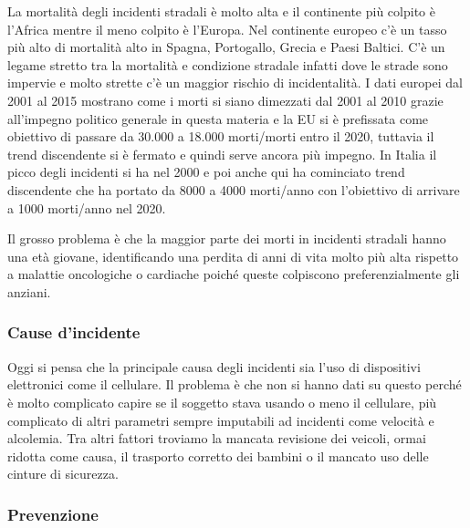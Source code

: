 La
mortalità degli incidenti stradali è molto alta e il continente più
colpito è l'Africa mentre il meno colpito è l'Europa. Nel continente
europeo c'è un tasso più alto di mortalità alto in Spagna, Portogallo,
Grecia e Paesi Baltici. C'è un legame stretto tra la mortalità e
condizione stradale infatti dove le strade sono impervie e molto strette
c'è un maggior rischio di incidentalità. I dati europei dal 2001 al 2015
mostrano come i morti si siano dimezzati dal 2001 al 2010 grazie
all'impegno politico generale in questa materia e la EU si è prefissata
come obiettivo di passare da 30.000 a 18.000 morti/morti entro il 2020,
tuttavia il trend discendente si è fermato e quindi serve ancora più
impegno. In Italia il picco degli incidenti si ha nel 2000 e poi anche
qui ha cominciato trend discendente che ha portato da 8000 a 4000
morti/anno con l'obiettivo di arrivare a 1000 morti/anno nel 2020.

Il grosso problema è che la maggior parte dei morti in incidenti
stradali hanno una età giovane, identificando una perdita di anni di
vita molto più alta rispetto a malattie oncologiche o cardiache poiché
queste colpiscono preferenzialmente gli anziani.

\subsubsection{Cause d'incidente}

Oggi si pensa che la principale causa degli incidenti sia l'uso di
dispositivi elettronici come il cellulare. Il problema è che non si
hanno dati su questo perché è molto complicato capire se il soggetto
stava usando o meno il cellulare, più complicato di altri parametri
sempre imputabili ad incidenti come velocità e alcolemia. Tra altri
fattori troviamo la mancata revisione dei veicoli, ormai ridotta come
causa, il trasporto corretto dei bambini o il mancato uso delle cinture
di sicurezza.

\subsubsection{Prevenzione}

